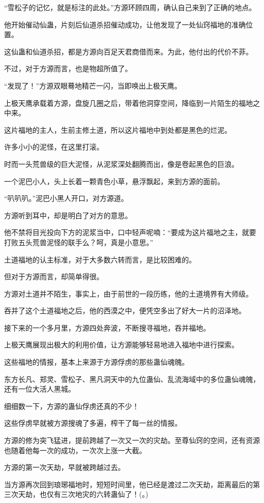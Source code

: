 \begin{this_body}
“雪松子的记忆，就是标注的此处。”方源环顾四周，确认自己来到了正确的地点。

他开始催动仙蛊，片刻后仙道杀招催动成功，让他发现了一处仙窍福地的准确位置。

这仙蛊和仙道杀招，都是方源向百足天君商借而来。为此，他付出的代价不菲。

不过，对于方源而言，也是物超所值了。

“发现了！”方源双眼蓦地精芒一闪，当即唤出上极天鹰。

上极天鹰承载着方源，盘旋几圈之后，带着他洞穿空间，降临到一片陌生的福地之中来。

这片福地的主人，生前主修土道，所以这片福地中到处都是黑色的烂泥。

许多小小的泥怪，在这里打滚。

时而一头荒兽级的巨大泥怪，从泥浆深处翻腾而出，像是卷起黑色的巨浪。

一个泥巴小人，头上长着一颗青色小草，悬浮飘起，来到方源的面前。

“叭叭叭。”泥巴小黑人开口，对方源道。

方源听到耳中，却是明白了对方的意思。

他不禁将目光投向下方的泥浆当中，口中轻声呢喃：“要成为这片福地之主，就要打败五头荒兽泥怪的联手么？呵，真是小意思。”

土道福地的认主标准，对于大多数六转而言，是比较困难的。

但对于方源而言，却简单得很。

方源对土道并不陌生，事实上，由于前世的一段历练，他的土道境界有大师级。

吞并了这个土道福地之后，他的西漠之中，便凭空多出了好大一片的沼泽地。

接下来的一个多月里，方源四处奔波，不断搜寻福地，吞并福地。

上极天鹰展现出极大的利用价值，让方源能够轻易地进入福地中进行探索。

这些福地的情报，基本上来源于方源俘虏的那些蛊仙魂魄。

东方长凡、郑灵、雪松子、黑凡洞天中的九位蛊仙、乱流海域中的多位蛊仙魂魄，还有一位大活人黑城。

细细数一下，方源的蛊仙俘虏还真的不少！

这些俘虏早就被方源搜魂了多遍，榨干了每一丝的情报。

方源的修为突飞猛进，提前跨越了一次又一次的灾劫。至尊仙窍的空间，还有资源也随着他每一次的成功，一次次上涨一大截。

方源的第一次天劫，早就被跨越过去。

当方源再次回到琅琊福地时，短短时间里，他已经是渡过二次天劫，距离最后的第三次天劫，也仅有三次地灾的六转蛊仙了！(。)

\end{this_body}
